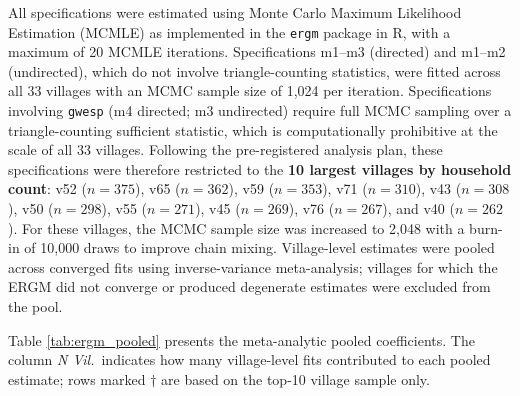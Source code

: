 \documentclass[11pt,a4paper]{article}
\begin{document}
All specifications were estimated using Monte Carlo Maximum Likelihood Estimation (MCMLE) as implemented in the \texttt{ergm} package \citep{Hunter2008} in R, with a maximum of 20 MCMLE iterations. Specifications m1--m3 (directed) and m1--m2 (undirected), which do not involve triangle-counting statistics, were fitted across all 33 villages with an MCMC sample size of 1,024 per iteration. Specifications involving \texttt{gwesp} (m4 directed; m3 undirected) require full MCMC sampling over a triangle-counting sufficient statistic, which is computationally prohibitive at the scale of all 33 villages. Following the pre-registered analysis plan, these specifications were therefore restricted to the \textbf{10 largest villages by household count}: v52 ($n=375$), v65 ($n=362$), v59 ($n=353$), v71 ($n=310$), v43 ($n=308$), v50 ($n=298$), v55 ($n=271$), v45 ($n=269$), v76 ($n=267$), and v40 ($n=262$). For these villages, the MCMC sample size was increased to 2,048 with a burn-in of 10,000 draws to improve chain mixing. Village-level estimates were pooled across converged fits using inverse-variance meta-analysis; villages for which the ERGM did not converge or produced degenerate estimates were excluded from the pool.

Table \ref{tab:ergm_pooled} presents the meta-analytic pooled coefficients. The column \textit{N Vil.}\ indicates how many village-level fits contributed to each pooled estimate; rows marked $\dagger$ are based on the top-10 village sample only.
\end{document}
